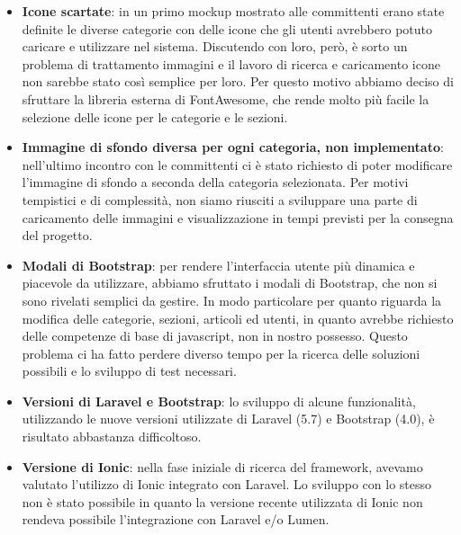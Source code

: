 \documentclass[twoside]{supsistudent}
\begin{document}
\begin{itemize}
\item \textbf{Icone scartate}: in un primo mockup mostrato alle committenti erano state definite le diverse categorie con delle icone che gli utenti avrebbero potuto caricare e utilizzare nel sistema. Discutendo con loro, però, è sorto un problema di trattamento immagini e il lavoro di ricerca e caricamento icone non sarebbe stato così semplice per loro. Per questo motivo abbiamo deciso di sfruttare la libreria esterna di FontAwesome, che rende molto più facile la selezione delle icone per le categorie e le sezioni.
\item \textbf{Immagine di sfondo diversa per ogni categoria, non implementato}: nell'ultimo incontro con le committenti ci è stato richiesto di poter modificare l'immagine di sfondo a seconda della categoria selezionata. Per motivi tempistici e di complessità, non siamo riusciti a sviluppare una parte di caricamento delle immagini e visualizzazione in tempi previsti per la consegna del progetto.
\item \textbf{Modali di Bootstrap}: per rendere l'interfaccia utente più dinamica e piacevole da utilizzare, abbiamo sfruttato i modali di Bootstrap, che non si sono rivelati semplici da gestire. In modo particolare per quanto riguarda la modifica delle categorie, sezioni, articoli ed utenti, in quanto avrebbe richiesto delle competenze di base di javascript, non in nostro possesso. Questo problema ci ha fatto perdere diverso tempo per la ricerca delle soluzioni possibili e lo sviluppo di test necessari.
\item \textbf{Versioni di Laravel e Bootstrap}: lo sviluppo di alcune funzionalità, utilizzando le nuove versioni utilizzate di Laravel (5.7) e Bootstrap (4.0), è risultato abbastanza difficoltoso.
\item \textbf{Versione di Ionic}: nella fase iniziale di ricerca del framework, avevamo valutato l'utilizzo di Ionic integrato con Laravel. Lo sviluppo con lo stesso non è stato possibile in quanto la versione recente utilizzata di Ionic non rendeva possibile l'integrazione con Laravel e/o Lumen.
\end{itemize}
\end{document}
